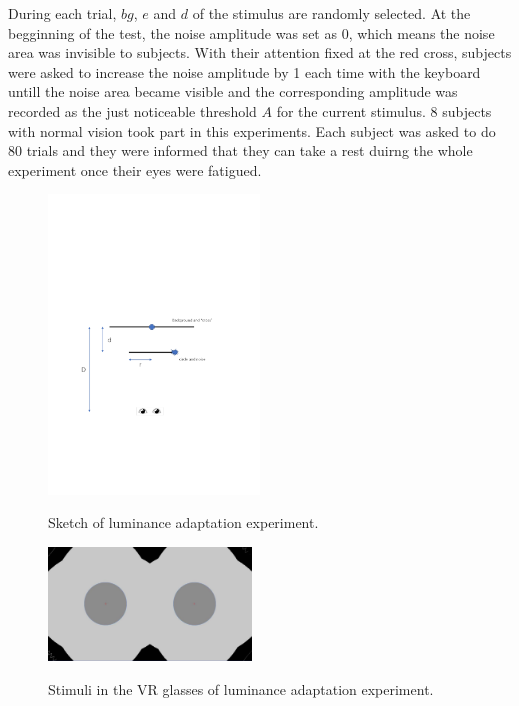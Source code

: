 \documentclass[journal]{IEEEtran}
\begin{document}
During each trial, $bg$, $e$ and $d$ of the stimulus are randomly selected. At the begginning of the test, the noise amplitude was set as 0, which means the noise area was invisible to subjects. With their attention fixed at the red cross, subjects were asked to increase the noise amplitude by 1 each time with the keyboard untill the noise area became visible and the corresponding amplitude was recorded as the just noticeable threshold $A$ for the current stimulus. 8 subjects with normal vision took part in this experiments. Each subject was asked to do 80 trials and they were informed that they can take a rest duirng the whole experiment once their eyes were fatigued.
\begin{figure}[!t]
	\centering
	\includegraphics[width=0.5\textwidth]{Drawing2}\\
	\caption{Sketch of luminance adaptation experiment.}
	\label{fig:Luminance}
\end{figure}

\begin{figure}[!t]
	\centering
	\includegraphics[width=0.48\textwidth]{ContrastSketch}\\
	\caption{Stimuli in the VR glasses of luminance adaptation experiment.}
	\label{fig:LuminanceSketch} 
\end{figure}
\end{document}
